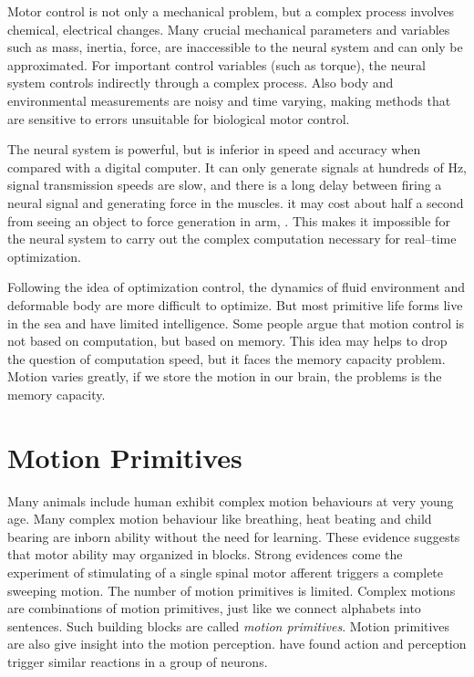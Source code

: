 \begin{itemize}
Motor control is not only a mechanical problem, but a complex process involves chemical, electrical changes.
Many crucial mechanical parameters and variables such as mass, inertia, force, are inaccessible to the neural system and can only be approximated. 
For important control variables (such as torque), the neural system controls indirectly through a complex process.
Also body and environmental measurements are noisy and time varying, making methods that are sensitive to errors unsuitable for biological motor control.

The neural system is powerful, but is inferior in speed and accuracy when compared with a digital computer. 
It can only generate signals at hundreds of Hz, signal transmission speeds are slow, and there is a long delay between firing a neural signal and generating force in the muscles.
it may cost about half a second from seeing an object to force generation in arm, . 
This makes it impossible for the neural system to carry out the complex computation necessary for real–time optimization.


Following the idea of optimization control, the dynamics of fluid environment and deformable body are more difficult to optimize. 
But most primitive life forms live in the sea and have limited intelligence. 
Some people argue that motion control is not based on computation, but based on memory.
This idea may helps to drop the question of computation speed, but it faces the memory capacity problem. 
Motion varies greatly, if we store the motion in our brain, the problems is the memory capacity.
\end{itemize}

\section{Motion Primitives}
Many animals include human exhibit complex motion behaviours at very young age.
Many complex motion behaviour like breathing, heat beating and child bearing are inborn ability without the need for learning.
These evidence suggests that motor ability may organized in blocks\citep{bizzi1995modular,bizzi2002book}.
Strong evidences come the experiment of stimulating of a single spinal motor afferent triggers a complete sweeping motion\citep{bizzi1995modular}.
The number of motion primitives is limited.
Complex motions are combinations of motion primitives, just like we connect alphabets into sentences.
Such building blocks are called \emph{motion primitives}.
Motion primitives are also give insight into the motion perception.
\citet{gallese1996action} have found action and perception trigger similar reactions in a group of neurons.





